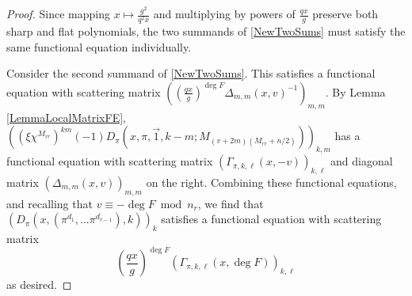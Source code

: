 \documentclass[11pt,letterpaper]{article}
\theoremstyle{definition}
\theoremstyle{remark}
\numberwithin{equation}{section}
\theoremstyle{dotless}
\newcommand{\res}[2]{\left(\frac{#1}{#2}\right)}
\begin{document}
\begin{proof}
Since mapping $x \mapsto  \frac{g^2}{q^2 x}$ and multiplying by powers of $\frac{qx}{g}$ preserve both sharp and flat polynomials, the two summands of \eqref{NewTwoSums} must satisfy the same functional equation individually. 

Consider the second summand of \eqref{NewTwoSums}. This satisfies a functional equation with scattering matrix $\left(\left(\frac{qx}{g}\right)^{\deg F}\Delta_{m,m}(x,v)^{-1}\right)_{m,m}$.
By Lemma \ref{LemmaLocalMatrixFE}, $\left((\xi \chi^{M_{rr}})^{k m}(-1) D_\pi(x, \pi, \vec{1}, k-m; M_{(v+2m)(M_{rr}+n/2)}) \right)_{k,m}$ has a functional equation with scattering matrix $\left( \Gamma_{\pi, k, \ell}(x, -v) \right)_{k, \ell}$ and diagonal matrix $\left(\Delta_{m,m}(x,v)\right)_{m,m}$ on the right. Combining these functional equations, and recalling that $v\equiv -\deg F \bmod n_r$, we find that $\left(D_\pi(x, (\pi^{d_1}, \ldots \pi^{d_{r-1}}), k)\right)_k$ satisfies a functional equation with scattering matrix
\begin{equation*}
\left(\frac{qx}{g}\right)^{\deg F} \left( \Gamma_{\pi, k, \ell}(x, \deg F) \right)_{k, \ell}
\end{equation*}
as desired. 


\end{proof}
\end{document}
